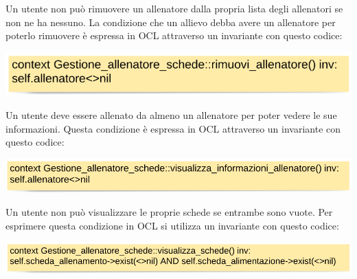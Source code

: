 \documentclass{article}
\begin{document}
      \hfill \break
      

   Un utente non può rimuovere un allenatore dalla propria lista degli allenatori se non ne ha nessuno. La condizione che un allievo debba avere un allenatore per poterlo rimuovere è espressa in OCL attraverso un invariante con questo codice:\\
   
   

    \begin{center}
            \includegraphics[scale=0.5]{OCL/Gestione allenatore e schede 1.png}
    \end{center}
    

      
      
    Un utente deve essere allenato da almeno un allenatore per poter vedere le sue informazioni. Questa condizione è espressa in OCL attraverso un invariante con questo codice:\\
    

    
    \begin{center}
            \includegraphics[scale=0.5]{OCL/Gestione allenatore e schede 2.png}
    \end{center}
    
    \hfill \break
    
    Un utente non può visualizzare le proprie schede se entrambe sono vuote. Per esprimere questa condizione in OCL si utilizza un invariante con questo codice:\\
    
    \begin{center}
            \includegraphics[scale=0.5]{OCL/Gestione allenatore e schede 3.png}
    \end{center}
    
    \hfill \break
    \hfill \break
    \hfill \break
    \hfill \break
    \hfill \break
    \hfill \break
    \hfill \break
    \hfill \break
    \hfill \break
    
\end{document}
